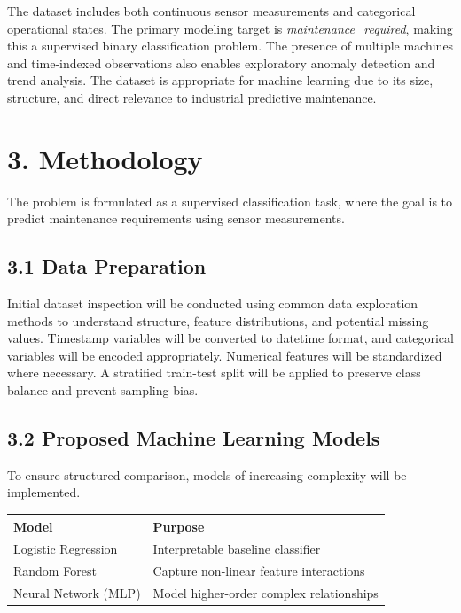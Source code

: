 \documentclass[12pt]{article}
\begin{document}
The dataset includes both continuous sensor measurements and categorical operational states. The primary modeling target is \textit{maintenance\_required}, making this a supervised binary classification problem. The presence of multiple machines and time-indexed observations also enables exploratory anomaly detection and trend analysis. The dataset is appropriate for machine learning due to its size, structure, and direct relevance to industrial predictive maintenance.

\section*{3. Methodology}

The problem is formulated as a supervised classification task, where the goal is to predict maintenance requirements using sensor measurements.

\subsection*{3.1 Data Preparation}

Initial dataset inspection will be conducted using common data exploration methods to understand structure, feature distributions, and potential missing values. Timestamp variables will be converted to datetime format, and categorical variables will be encoded appropriately. Numerical features will be standardized where necessary. A stratified train-test split will be applied to preserve class balance and prevent sampling bias.

\subsection*{3.2 Proposed Machine Learning Models}

To ensure structured comparison, models of increasing complexity will be implemented.

\begin{table}[ht]
\centering
\begin{tabular}{ll}
\toprule
\textbf{Model} & \textbf{Purpose} \\
\midrule
Logistic Regression & Interpretable baseline classifier \\
Random Forest & Capture non-linear feature interactions \\
Neural Network (MLP) & Model higher-order complex relationships \\
\bottomrule
\end{tabular}
\end{table}
\end{document}
